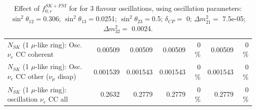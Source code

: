\begin{table}
\begin{tabular}{| l | r | r | r  r | r  r |}
                          $N_{SK}$ (1 $\mu$-like ring): Osc. $\nu_e$ CC coherent &         0.00509 &         0.00509 &         0.00509 &        0 \%  &         0.00509 &        0 \%  \\ 
           $N_{SK}$ (1 $\mu$-like ring): Osc. $\nu_e$ CC other ($\nu_\mu$ disap) &        0.001539 &        0.001543 &        0.001543 &        0 \%  &        0.001543 &        0 \%  \\ 
                        $N_{SK}$ (1 $\mu$-like ring): oscillation $\nu_e$ CC all &          0.2632 &          0.2779 &          0.2779 &        0 \%  &          0.2779 &        0 \%  \\ 
\hline
\hline
\end{tabular}
\caption{ Effect of $f_{0; r}^{SK+FSI}$ for for 3 flavour oscillations, using oscillation parameters:  $\sin^2\theta_{12} = $0.306; $\sin^2\theta_{13} = $0.0251; $\sin^2\theta_{23} = $0.5; $\delta_{CP} = $        0; $\Delta m^2_{21} = $    7.5e-05; $\Delta m^2_{32} = $    0.0024. }
\label{tab:num_skdetfsi_000_1RmuT_3f_osc_t13:0.0251_spectralreco_spectraltrue}
\end{table}
\clearpage
